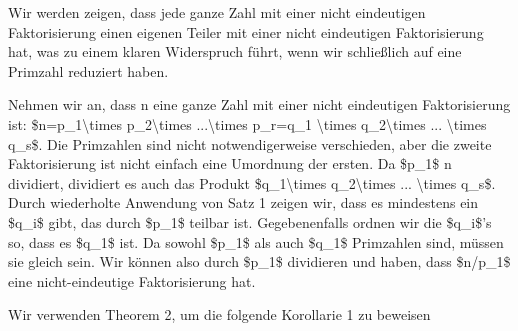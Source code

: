 \documentclass[a4paper]{article}
\begin{document}
\begin{multicols}{3}
\begin{itemize*}
\begin{itemize*}
                  \begin{itemize*} \item Wir werden zeigen, dass jede ganze Zahl mit einer nicht eindeutigen Faktorisierung einen eigenen Teiler mit einer nicht eindeutigen Faktorisierung hat, was zu einem klaren Widerspruch führt, wenn wir schließlich auf eine Primzahl reduziert haben. \item Nehmen wir an, dass n eine ganze Zahl mit einer nicht eindeutigen Faktorisierung ist: \$n=p\_1\textbackslash times p\_2\textbackslash times ...\textbackslash times p\_r=q\_1 \textbackslash times q\_2\textbackslash times ... \textbackslash times q\_s\$. Die Primzahlen sind nicht notwendigerweise verschieden, aber die zweite Faktorisierung ist nicht einfach eine Umordnung der ersten. Da \$p\_1\$ n dividiert, dividiert es auch das Produkt \$q\_1\textbackslash times q\_2\textbackslash times ... \textbackslash times q\_s\$. Durch wiederholte Anwendung von Satz 1 zeigen wir, dass es mindestens ein \$q\_i\$ gibt, das durch \$p\_1\$ teilbar ist. Gegebenenfalls ordnen wir die \$q\_i\$'s so, dass es \$q\_1\$ ist. Da sowohl \$p\_1\$ als auch \$q\_1\$ Primzahlen sind, müssen sie gleich sein. Wir können also durch \$p\_1\$ dividieren und haben, dass \$n/p\_1\$ eine nicht-eindeutige Faktorisierung hat. \end{itemize*}
                  \item Wir verwenden Theorem 2, um die folgende Korollarie 1 zu beweisen

\end{itemize*}
\end{itemize*}
\end{multicols}
\end{document}
